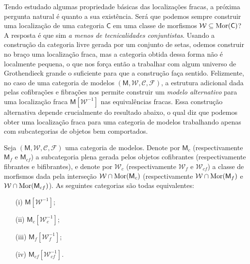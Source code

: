 Tendo estudado algumas propriedade básicas das localizações fracas, a próxima pergunta natural é quanto a sua existência.
Será que podemos sempre construir uma localização de uma categoria $\mathsf{C}$ em uma classe de morfismos $\mathcal{W} \subseteq \mathrm{Mor}(\mathsf{C})$?
A resposta é que sim \emph{a menos de tecnicalidades conjuntistas}.
Usando a construção da categoria livre gerada por um conjunto de setas, odemos construir no braço uma localização fraca, mas a categoria obtida dessa forma não é localmente pequena, o que nos força então a trabalhar com algum universo de Grothendieck grande o suficiente para que a construção faça sentido.
Felizmente, no caso de uma categoria de modelos $(\mathsf{M},\mathcal{W},\mathcal{C},\mathcal{F})$, a estrutura adicional dada pelas cofibrações e fibrações nos permite construir um \emph{modelo alternativo} para uma localização fraca $\mathsf{M}[\mathcal{W}^{-1}]$ nas equivalências fracas.
Essa construção alternativa depende crucialmente do resultado abaixo, o qual diz que podemos obter uma localização fraca para uma categoria de modelos trabalhando apenas com subcategorias de objetos bem comportados.

\begin{teo}
  Seja $(\mathsf{M},\mathcal{W},\mathcal{C},\mathcal{F})$ uma categoria de modelos.
  Denote por $\mathsf{M}_{c}$ (respectivamente $\mathsf{M}_{f}$ e $\mathsf{M}_{cf}$) a subcategoria plena gerada pelos objetos cofibrantes (respectivamente fibrantes e bifibrantes), e denote por $\mathcal{W}_{c}$ (respectivamente $\mathcal{W}_{f}$ e $\mathcal{W}_{cf}$) a classe de morfismos dada pela interseção $\mathcal{W} \cap \mathrm{Mor}(\mathsf{M}_{c})$ (respectivamente $\mathcal{W} \cap \mathrm{Mor}(\mathsf{M}_{f})$ e $\mathcal{W} \cap \mathrm{Mor}(\mathsf{M}_{cf})$).
  As seguintes categorias são todas equivalentes:
  \begin{enumerate}
  \item[(i)] $\mathsf{M}[\mathcal{W}^{-1}]$;
    
  \item[(ii)] $\mathsf{M}_{c}[\mathcal{W}_{c}^{-1}]$;
    
  \item[(iii)] $\mathsf{M}_{f}[\mathcal{W}_{f}^{-1}]$;
    
  \item[(iv)] $\mathsf{M}_{cf}[\mathcal{W}_{cf}^{-1}]$.
  \end{enumerate}
\end{teo}

